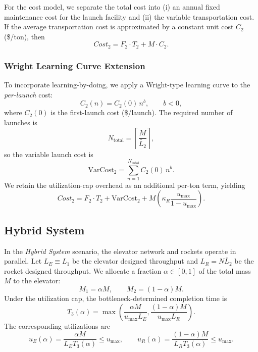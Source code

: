 \documentclass{mcmthesis}
\begin{document}
For the cost model, we separate the total cost into (i) an annual fixed maintenance cost for the launch facility and (ii) the variable transportation cost.
If the average transportation cost is approximated by a constant unit cost $C_2$ (\$/ton), then
\begin{equation}
Cost_2 = F_2\cdot T_2 + M\cdot C_2.
\end{equation}

\subsubsection{Wright Learning Curve Extension}
To incorporate learning-by-doing, we apply a Wright-type learning curve to the \emph{per-launch} cost:
\begin{equation}
C_2(n)=C_2(0)\,n^{b},\qquad b<0,
\end{equation}
where $C_2(0)$ is the first-launch cost (\$/launch).
The required number of launches is
\begin{equation}
N_{\text{total}}=\left\lceil\frac{M}{\bar L_2}\right\rceil,
\end{equation}
so the variable launch cost is
\begin{equation}
\text{VarCost}_2=\sum_{n=1}^{N_{\text{total}}}C_2(0)\,n^{b}.
\end{equation}
We retain the utilization-cap overhead as an additional per-ton term, yielding
\begin{equation}
Cost_2=F_2\cdot T_2+\text{VarCost}_2+M\left(\kappa_R\frac{u_{\max}}{1-u_{\max}}\right).
\end{equation}

\subsection{Hybrid System}
In the \emph{Hybrid System} scenario, the elevator network and rockets operate in parallel.
Let $L_E \equiv L_1$  be the elevator designed throughput and $L_R=N\bar L_2$  be the rocket designed throughput.
We allocate a fraction $\alpha\in[0,1]$ of the total mass $M$ to the elevator:
\begin{equation}
M_1=\alpha M,\qquad M_2=(1-\alpha)M.
\end{equation}
Under the utilization cap, the bottleneck-determined completion time is
\begin{equation}
T_3(\alpha)=\max\!\left(\frac{\alpha M}{u_{\max}L_E},\frac{(1-\alpha)M}{u_{\max}L_R}\right).
\end{equation}
The corresponding utilizations are
\begin{equation}
u_E(\alpha)=\frac{\alpha M}{L_ET_3(\alpha)}\le u_{\max},\qquad
u_R(\alpha)=\frac{(1-\alpha)M}{L_RT_3(\alpha)}\le u_{\max}.
\end{equation}
\end{document}
